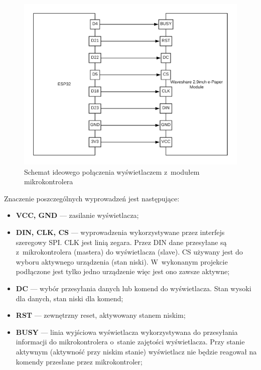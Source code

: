 \documentclass[a4paper,12pt, twoside]{article}
\begin{document}
\begin{enumerate}
            \begin{figure}[H]
    	        \centering
    			\includegraphics[width=12cm]{images/schemat_polaczenia_mikro_z_wyswietlaczem.png}
    			\caption{Schemat ideowego połączenia wyświetlaczem z~modułem mikrokontrolera}
                \label{fig:polecznie_mikro_z_epapierem}
    	    \end{figure}
        
            Znaczenie poszczególnych wyprowadzeń jest następujące: 
            \begin{itemize}
                \item \textbf{VCC, GND} — zasilanie wyświetlacza;
                \item \textbf{DIN, CLK, CS} — wyprowadzenia wykorzystywane przez interfejs szeregowy SPI. CLK jest linią zegara. Przez DIN dane przesyłane są z~mikrokontrolera (mastera) do wyświetlacza (slave). CS używany jest do wyboru aktywnego urządzenia (stan niski). W~wykonanym projekcie podłączone jest tylko jedno urządzenie więc jest ono zawsze aktywne;
                \item \textbf{DC} — wybór przesyłania danych lub komend do wyświetlacza. Stan wysoki dla danych, stan niski dla komend;
                \item \textbf{RST} — zewnętrzny reset, aktywowany stanem niskim;
                \item \textbf{BUSY}  — linia wyjściowa wyświetlacza wykorzystywana do przesyłania informacji do mikrokontrolera o~stanie zajętości wyświetlacza. Przy stanie aktywnym (aktywność przy niskim stanie) wyświetlacz nie będzie reagował na komendy przesłane przez mikrokontroler; 
            \end{itemize}
        \end{enumerate}
        
\end{document}
